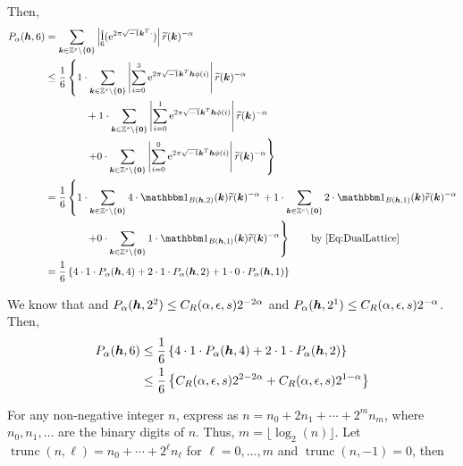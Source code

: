 \documentclass{amsart}
\newcommand{\tr}{\widetilde{r}}
\DeclareMathOperator{\appxint}{\hat{I}}
\DeclareMathOperator{\trun}{trunc}
\begin{document}
 Then,
\begin{align*}
    P_\alpha(\vh,6) & = \sum_{\vk \in \integers^s \setminus\{\vzero\}}
    \abs{\appxint_6(\me^{2 \pi \sqrt{-1} \vk^T \cdot})}\tr(\vk)^{-\alpha}
    \\
    & \le
    \frac {1}{6} \left\{ 1\cdot\sum_{\vk \in \integers^s \setminus\{\vzero\}} \abs{\sum_{i=0}^{3}\me^{2 \pi \sqrt{-1} \vk^T \vh\phi(i)}} \tr(\vk)^{-\alpha}  \right .
    \\
    & \qquad \qquad + 1  \cdot \sum_{\vk \in \integers^s \setminus\{\vzero\}} \abs{\sum_{i=0}^{1}\me^{2 \pi \sqrt{-1} \vk^T \vh\phi(i)}} \tr(\vk)^{-\alpha}  \\
    & \qquad \qquad \left . +  0
    \cdot \sum_{\vk \in \integers^s \setminus\{\vzero\}} \abs{\sum_{i=0}^{0}\me^{2 \pi \sqrt{-1} \vk^T \vh\phi(i)}}  \tr(\vk)^{-\alpha} \right\}\\
    & =
    \frac {1}{6} \left\{ 1\cdot\sum_{\vk \in \integers^s \setminus\{\vzero\}} 4 \cdot \bbone_{B(\vh,2)}(\vk) \tr(\vk)^{-\alpha}  \right .
    + 1  \cdot \sum_{\vk \in \integers^s \setminus\{\vzero\}}2 \cdot \bbone_{B(\vh,1)}(\vk) \tr(\vk)^{-\alpha}  \\
    & \qquad \qquad \left . +  0
    \cdot \sum_{\vk \in \integers^s \setminus\{\vzero\}} 1 \cdot \bbone_{B(\vh,1)}(\vk)  \tr(\vk)^{-\alpha} \right\} \qquad \text{by \eqref{Eq:DualLattice}}\\
    & = \frac {1}{6} \left\{ 4 \cdot 1 \cdot P_\alpha(\vh,4)+ 2 \cdot 1 \cdot P_\alpha(\vh,2)+ 1 \cdot 0 \cdot P_\alpha(\vh,1) \right\} \\
\end{align*}

We know that and $P_\alpha(\boldsymbol{h},2^2) \le C_{R}(\alpha,\epsilon,s)
    2^{-2\alpha}$ and $P_\alpha(\boldsymbol{h},2^1) \le C_{R}(\alpha,\epsilon,s)
    2^{-\alpha} $. Then,
    \begin{align*}
        P_\alpha(\boldsymbol{h},6) & \le \frac {1}{6} \left\{ 4 \cdot 1 \cdot P_\alpha(\boldsymbol{h},4) + 2 \cdot 1 \cdot P_\alpha(\boldsymbol{h},2) \right\} \\
         & \le \frac {1}{6} \left\{C_{R}(\alpha,\epsilon,s)
         2^{2-2\alpha} + C_{R}(\alpha,\epsilon,s)
         2^{1-\alpha} \right\}
    \end{align*}


For any non-negative integer $n$, express as  $n = n_0 + 2n_1 + \cdots + 2^m n_m$, where $n_0, n_1, \ldots$ are the binary digits of $n$.  Thus, $m = \lfloor \log_2(n) \rfloor$.  Let $\trun(n,\ell) = n_0 + \cdots + 2^{\ell} n_{\ell}$ for $\ell = 0, \ldots, m$ and $\trun(n,-1) = 0$, then
\end{document}
